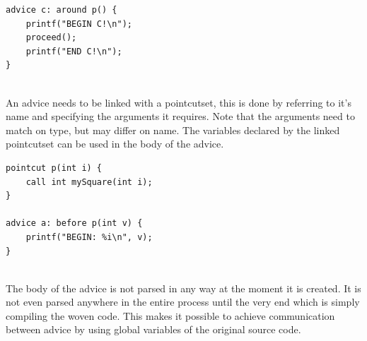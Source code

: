 \documentclass[a4paper]{report}
\begin{document}
\begin{minipage}{0.42\textwidth}
\begin{lstlisting}[caption=Example of an around advice., label=lst:SmallC_AroundAdvice]
advice c: around p() {
	printf("BEGIN C!\n");
	proceed();
	printf("END C!\n");
}
\end{lstlisting}
\end{minipage}
\\
An advice needs to be linked with a pointcutset, this is done by referring to it's name and specifying the arguments it requires. Note that the arguments need to match on type, but may differ on name. The variables declared by the linked pointcutset can be used in the body of the advice.\\
\begin{minipage}{\linewidth}
\begin{lstlisting}[caption=Example of arguments.,label=lst:SmallC_Arguments]
pointcut p(int i) {
	call int mySquare(int i);
}

advice a: before p(int v) {
	printf("BEGIN: %i\n", v);
}
\end{lstlisting}
\end{minipage}\\
The body of the advice is not parsed in any way at the moment it is created. It is not even parsed anywhere in the entire process until the very end which is simply compiling the woven code. This makes it possible to achieve communication between advice by using global variables of the original source code.
\end{document}
